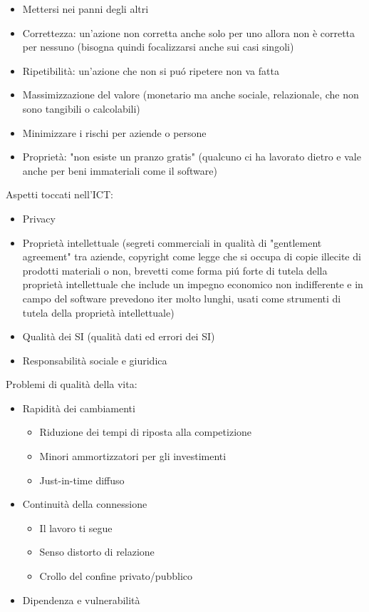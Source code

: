 \begin{itemize}

\item
  Mettersi nei panni degli altri
\item
  Correttezza: un'azione non corretta anche solo per uno allora non \`e
  corretta per nessuno (bisogna quindi focalizzarsi anche sui casi
  singoli)
\item
  Ripetibilit\`a: un'azione che non si pu\'o ripetere non va fatta
\item
  Massimizzazione del valore (monetario ma anche sociale, relazionale,
  che non sono tangibili o calcolabili)
\item
  Minimizzare i rischi per aziende o persone
\item
  Propriet\`a: "non esiste un pranzo gratis" (qualcuno ci ha lavorato
  dietro e vale anche per beni immateriali come il software)
\end{itemize}

Aspetti toccati nell'ICT:

\begin{itemize}

\item
  Privacy
\item
  Propriet\`a intellettuale (segreti commerciali in qualit\`a di
  "gentlement agreement" tra aziende, copyright come legge che si
  occupa di copie illecite di prodotti materiali o non, brevetti come
  forma pi\'u forte di tutela della propriet\`a intellettuale che include un
  impegno economico non indifferente e in campo del software prevedono
  iter molto lunghi, usati come strumenti di tutela della propriet\`a
  intellettuale)
\item
  Qualit\`a dei SI (qualit\`a dati ed errori dei SI)
\item
  Responsabilit\`a sociale e giuridica
\end{itemize}

Problemi di qualit\`a della vita:

\begin{itemize}

\item
  Rapidit\`a dei cambiamenti
  
  \begin{itemize}
    \item 
      Riduzione dei tempi di riposta alla competizione
    \item 
      Minori ammortizzatori per gli investimenti
    \item
      Just-in-time diffuso
  \end{itemize}
\item
  Continuità della connessione
  \begin{itemize}
    
    \item 
      Il lavoro ti segue
    \item 
      Senso distorto di relazione
    \item 
      Crollo del confine privato/pubblico
  \end{itemize}
\item
  Dipendenza e vulnerabilit\`a
\end{itemize}

